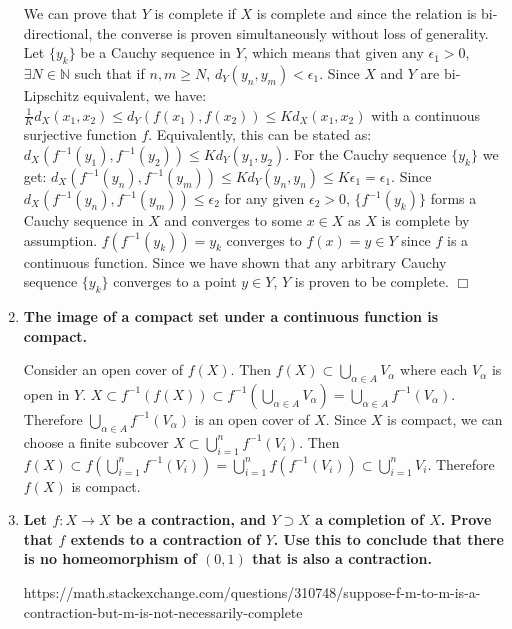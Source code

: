 \documentclass[12pt,letterpaper,reqno]{amsart}
\newcommand{\N}{\mathbb N}
\begin{document}
\begin{enumerate}[1.]
\begin{flushleft}
    We can prove that $Y$ is complete if $X$ is complete and since the relation is bi-directional, the converse is proven simultaneously without loss of generality. Let $\{y_k\}$ be a Cauchy sequence in $Y$, which means that given any $\epsilon_1 > 0$, $\exists N \in \N$ such that if $n, m \geq N$, $d_Y(y_n, y_m) < \epsilon_1$. Since $X$ and $Y$ are bi-Lipschitz equivalent, we have: $\frac{1}{K}d_X(x_1, x_2) \leq d_Y(f(x_1), f(x_2)) \leq Kd_X(x_1, x_2)$ with a continuous surjective function $f$. Equivalently, this can be stated as: $d_X(f^{-1}(y_1), f^{-1}(y_2)) \leq Kd_Y(y_1, y_2)$. For the Cauchy sequence $\{y_k\}$ we get: $d_X(f^{-1}(y_n), f^{-1}(y_m)) \leq Kd_Y(y_n, y_n) \leq K\epsilon_1 = \epsilon_1$. Since $d_X(f^{-1}(y_n), f^{-1}(y_m)) \leq \epsilon_2$ for any given $\epsilon_2 > 0$, $\{f^{-1}(y_k)\}$ forms a Cauchy sequence in $X$ and converges to some $x \in X$ as $X$ is complete by assumption. $f(f^{-1}(y_k)) = y_k$ converges to $f(x) = y \in Y$ since $f$ is a continuous function. Since we have shown that any arbitrary Cauchy sequence $\{y_k\}$ converges to a point $y \in Y$, $Y$ is proven to be complete. $\Box$
\end{flushleft}
\item \textbf{The image of a compact set under a continuous function is compact.}
\begin{flushleft}
    Consider an open cover of $f(X)$. Then $f(X) \subset \bigcup_{\alpha\in A} V_\alpha$ where each $V_\alpha$ is open in $Y$. $X \subset f^{-1}(f(X)) \subset f^{-1}\left( \bigcup_{\alpha\in A} V_\alpha \right) = \bigcup_{\alpha\in A} f^{-1}(V_\alpha)$. Therefore $\bigcup_{\alpha\in A} f^{-1}(V_\alpha)$ is an open cover of $X$. Since $X$ is compact, we can choose a finite subcover $X \subset \bigcup_{i=1}^n f^{-1}(V_i)$. Then $f(X) \subset f\left(\bigcup_{i=1}^n f^{-1}(V_i)\right) = \bigcup_{i=1}^n f\left(f^{-1}(V_i)\right) \subset \bigcup_{i=1}^n V_i$. Therefore $f(X)$ is compact.
\end{flushleft}
\item \textbf{Let $f: X\rightarrow X$ be a contraction, and $Y\supset X$ a completion of $X$. Prove that $f$ extends to a contraction of $Y$. Use this to conclude that there is no homeomorphism of $(0,1)$ that is also a contraction.}
\begin{flushleft}
    https://math.stackexchange.com/questions/310748/suppose-f-m-to-m-is-a-contraction-but-m-is-not-necessarily-complete
\end{flushleft}
\vspace{1in}

\end{enumerate}
\end{document}
